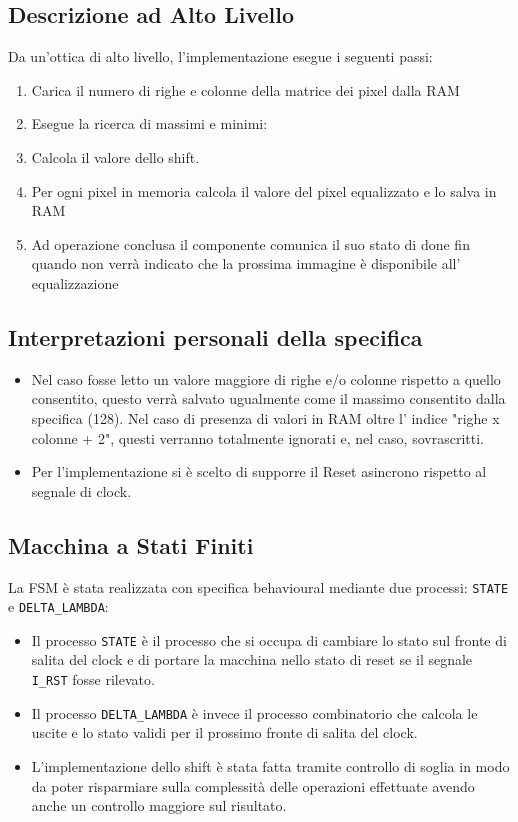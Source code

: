 \documentclass{article}
\begin{document}
\subsection{Descrizione ad Alto Livello}

Da un'ottica di alto livello, l'implementazione esegue i seguenti passi:

\begin{enumerate}
\item Carica il numero di righe e colonne della matrice dei pixel dalla RAM
\item Esegue la ricerca di massimi e minimi:
\item Calcola il valore dello shift.
\item Per ogni pixel in memoria calcola il valore del pixel equalizzato e lo salva in RAM
\item Ad operazione conclusa il componente comunica il suo stato di done fin quando non verrà indicato che la prossima immagine è disponibile all' equalizzazione
\end{enumerate}

\subsection{Interpretazioni personali della specifica}

\begin{itemize}
    \item Nel caso fosse letto un valore maggiore di righe e/o colonne rispetto a quello consentito, questo verrà salvato ugualmente come il massimo consentito dalla specifica (128). Nel caso di presenza di valori in RAM oltre l' indice "righe x colonne + 2", questi verranno totalmente ignorati e, nel caso, sovrascritti.
    \item Per l'implementazione si è scelto di supporre il Reset asincrono rispetto al segnale di clock.
\end{itemize}

\subsection{Macchina a Stati Finiti}

La FSM è stata realizzata con specifica behavioural mediante due processi: \texttt{STATE} e \texttt{DELTA\_LAMBDA}: 
\begin{itemize}
    \item Il processo \texttt{STATE} è il processo che si occupa di cambiare lo stato sul fronte di salita del clock e di portare la macchina nello stato di reset se il segnale \texttt{I\_RST} fosse rilevato.
    \item Il processo \texttt{DELTA\_LAMBDA} è invece il processo combinatorio che calcola le uscite e lo stato validi per il prossimo fronte di salita del clock.
    \item L'implementazione dello shift è stata fatta tramite controllo di soglia in modo da poter risparmiare sulla complessità delle operazioni effettuate avendo anche un controllo maggiore sul risultato. 
\end{itemize}
\end{document}
